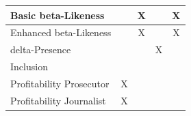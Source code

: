 \documentclass[12pt, a4paper,oneside]{report}
\begin{document}
\begin{table}[]
{\begin{tabular}{|l|c|c|c|c|}
			Basic beta-Likeness                                   &                                                                                & X                                                                                 &                                                                              & X                                                                                   \\ \hline
			Enhanced beta-Likeness                                &                                                                                & X                                                                                 &                                                                              & X                                                                                   \\ \hline
			delta-Presence                                        &                                                                                &                                                                                   & X                                                                            &                                                                                     \\ \hline
			Inclusion                                             &                                                                                &                                                                                   &                                                                              &                                                                                     \\ \hline
			Profitability Prosecutor                              & X                                                                              &                                                                                   &                                                                              &                                                                                     \\ \hline
			Profitability Journalist                              & X                                                                              &                                                                                   &                                                                              &                                                                                     \\ \hline

\end{tabular}}
\end{table}
\end{document}
